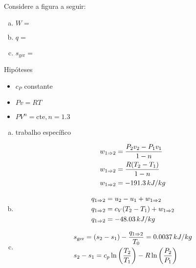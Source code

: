\documentclass[a4paper,12pt]{memoir}
\begin{document}
\begin{Exerc}[8.117 6\pa Ed.]
Considere a figura a seguir:


\begin{enumerate}[a)]
 \item $W =$
 \item $q =$
 \item $s_{\operatorname{ger}} =$
\end{enumerate}
\end{Exerc}

\begin{sol}
Hipóteses

\begin{itemize}
\item $c_{P}$ constante
\item $Pv = RT$
\item $PV^{n}=\text{cte}, n = 1.3$
\end{itemize}

\begin{enumerate}[a)]
 \item trabalho específico

\[
\begin{gathered}
  w_{1 \imp 2} = \frac{P_2 v_2 - P_1 v_1}{1-n} \hfill \\
  w_{1 \imp 2} = \frac{R(T_2 - T_1)}{1-n} \hfill \\
  w_{1 \imp 2} = -191.3\,kJ/kg \hfill \\
\end{gathered} 
\]

 \item

\[
\begin{gathered}
  q_{1 \imp 2} = u_2 - u_1 + w_{1 \imp 2} \hfill \\
  q_{1 \imp 2} = c_V (T_2 - T_1) + w_{1 \imp 2} \hfill \\ 
  q_{1 \imp 2} = -48.03\,kJ/kg \hfill \\ 
\end{gathered} 
\]

 \item

\[
\begin{gathered}
  s_{\operatorname{ger}} = (s_2 - s_1) - \frac{q _{1 \imp 2}}{T_0} = 0.0037\,kJ/kg \hfill \\
  s_2 - s_1 = c_p \ln \left( \frac{T_2}{T_1} \right) - R\ln \left( \frac{P_2}{P_1} \right) \hfill \\ 
\end{gathered} 
\]

\end{enumerate}
\end{sol}
\end{document}
